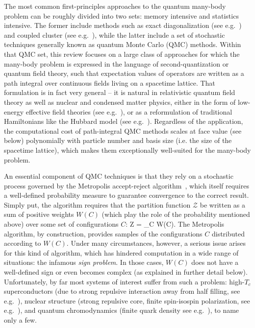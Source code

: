 \documentclass[../main.tex]{subfiles}
\begin{document}
The most common first-principles approaches to the quantum many-body problem can be roughly divided into two sets: memory intensive and statistics intensive. The former include methods such as exact diagonalization (see e.g.~\cite{BARRETT2013131,Johnson:2018hrx}) and coupled cluster (see e.g.~\cite{RevModPhys.79.291, Hagen:2013nca}), while the latter include a set of stochastic techniques generally known as quantum Monte Carlo (QMC) methods. Within that QMC set, this review focuses on a large class of approaches for which the many-body problem is expressed in the language of second-quantization or quantum field theory, such that expectation values of operators are written as a path integral over continuous fields living on a spacetime lattice. That formulation is in fact very general -- it is natural in relativistic quantum field theory as well as nuclear and condensed matter physics, either in the form of low-energy effective field theories (see e.g.~\cite{Burgess:2007pt,RevModPhys.81.1773,Machleidt:2011zz}), or as a reformulation of traditional Hamiltonians like the Hubbard model (see e.g.~\cite{Shankar:1996vk,doi:10.1142.6826}). Regardless of the application, the computational cost of path-integral QMC methods scales at face value (see below) polynomially with particle number and basis size (i.e. the size of the spacetime lattice), which makes them exceptionally well-suited for the many-body problem.

An essential component of QMC techniques is that they rely on a stochastic process governed by the Metropolis accept-reject algorithm~\cite{Metropolis}, which itself requires a well-defined probability measure to guarantee convergence to the correct result. Simply put, the algorithm requires that the
partition function $\mathcal Z$ be written as a sum of positive weights $W(C)$ (which play the role of the probability mentioned above) over some set of configurations $C$:
%
\beq
\mathcal Z = \sum_C W(C).
\eeq
%
The Metropolis algorithm, by construction, provides samples of the configurations $C$ distributed according to $W(C)$. Under many circumstances, however, a serious issue arises for this kind of algorithm, which has hindered computation in a wide range of situations: the infamous {\it sign problem}.
In those cases, $W(C)$ does not have a well-defined sign or even becomes complex (as explained in further detail below). Unfortunately, by far most systems of interest suffer from such a problem: high-$T_c$ superconductors (due to strong repulsive interaction away from half filling, see e.g.~\cite{PhysRevB.41.9301}), nuclear structure (strong repulsive core, finite spin-isospin polarization, see e.g.~\cite{KOONIN19971, Alhassid:2016ojg}), and quantum chromodynamics (finite quark density see e.g.~\cite{Gattringer:2016kco, Bongiovanni:2016ess, Aarts:2015tyj}), to name only a few.
\end{document}
